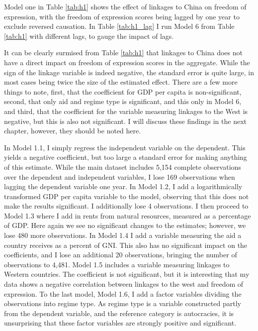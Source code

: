 Model one in Table \ref{tab:h1} shows the effect of linkages to China on freedom of expression, with the freedom of expression scores being lagged by one year to exclude reversed causation. In Table \ref{tab:h1_lag} I run Model 6 from Table \ref{tab:h1} with different lags, to gauge the impact of lags. 

It can be clearly surmised from Table \ref{tab:h1} that linkages to China does not have a direct impact on freedom of expression scores in the aggregate. While the sign of the linkage variable is indeed negative, the standard error is quite large, in most cases being twice the size of the estimated effect. There are a few more things to note, first, that the coefficient for GDP per capita is non-significant, second, that only aid and regime type is significant, and this only in Model 6, and third, that the coefficient for the variable measuring linkages to the West is negative, but this is also not significant. I will discuss these findings in the next chapter, however, they should be noted here.

In Model 1.1, I simply regress the independent variable on the dependent. This yields a negative coefficient, but too large a standard error for making anything of this estimate. While the main dataset includes 5,154 complete observations over the dependent and independent variables, I lose 169 observations when lagging the dependent variable one year. In Model 1.2, I add a logarithmically transformed GDP per capita variable to the model, observing that this does not make the results significant. I additionally lose 4 observations. I then proceed to Model 1.3 where I add in rents from natural resources, measured as a percentage of GDP. Here again we see no significant changes to the estimates; however, we lose 480 more observations. In Model 1.4 I add a variable measuring the aid a country receives as a percent of GNI. This also has no significant impact on the coefficients, and I lose an additional 20 observations, bringing the number of observations to 4,481. Model 1.5 includes a variable measuring linkages to Western countries. The coefficient is not significant, but it is interesting that my data shows a negative correlation between linkages to the west and freedom of expression. To the last model, Model 1.6, I add a factor variables dividing the observations into regime type. As regime type is a variable constructed partly from the dependent variable, and the reference category is autocracies, it is unsurprising that these factor variables are strongly positive and significant.

